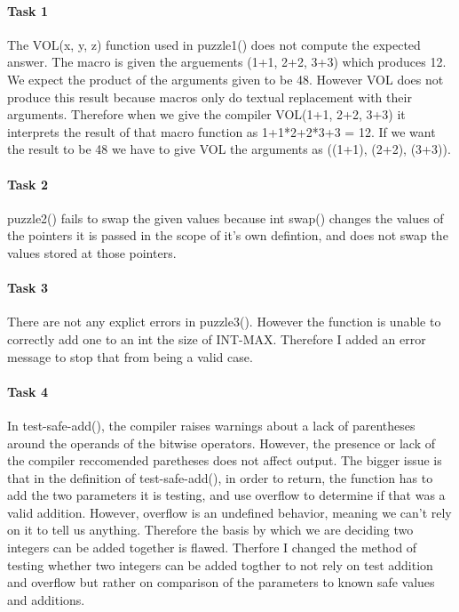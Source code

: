 \documentclass[11pt]{article}
\begin{document}
\paragraph{Task 1}
The VOL(x, y, z) function used in puzzle1() does not compute the expected answer. The macro is given the arguements (1+1, 2+2, 3+3) which produces 12. We expect the product of the arguments given to be 48. However VOL does not produce this result because macros only do textual replacement with their arguments. Therefore when we give the compiler VOL(1+1, 2+2, 3+3) it interprets the result of that macro function as 1+1*2+2*3+3 = 12. If we want the result to be 48 we have to give VOL the arguments as ((1+1), (2+2), (3+3)).
\paragraph{Task 2}
puzzle2() fails to swap the given values because int swap() changes the values of the pointers it is passed in the scope of it's own defintion, and does not swap the values stored at those pointers.
\paragraph{Task 3}
There are not any explict  errors in puzzle3(). However the function is unable to correctly add one to an int the size of INT-MAX. Therefore I added an error message to stop that from being a valid case.
\paragraph{Task 4}
In test-safe-add(), the compiler raises warnings about a lack of parentheses around the operands of the bitwise operators. However, the presence or lack of the compiler reccomended paretheses does not affect output. The bigger issue is that in the definition of test-safe-add(), in order to return, the function has to add the two parameters it is testing, and use overflow to determine if that was a valid addition. However, overflow is an undefined behavior, meaning we can't rely on it to tell us anything. Therefore the basis by which we are deciding two integers can be added together is flawed. Therfore I changed the method of testing whether two integers can be added togther to not rely on test addition and overflow but rather on comparison of the parameters to known safe values and additions.
\end{document}
